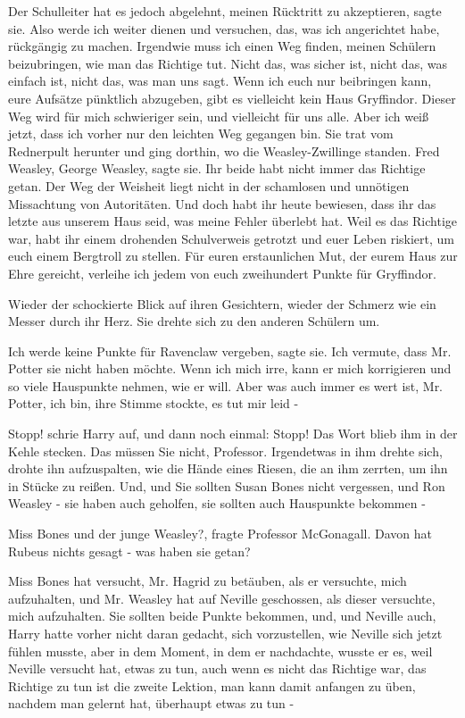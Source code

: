 \glqq{}Der Schulleiter hat es jedoch abgelehnt, meinen Rücktritt zu
akzeptieren\grqq{}, sagte sie. \glqq{}Also werde ich weiter dienen und versuchen,
das, was ich angerichtet habe, rückgängig zu machen. Irgendwie muss ich einen
Weg finden, meinen Schülern beizubringen, wie man das Richtige tut. Nicht das,
was sicher ist, nicht das, was einfach ist, nicht das, was man uns sagt. Wenn
ich euch nur beibringen kann, eure Aufsätze pünktlich abzugeben, gibt es
vielleicht kein Haus Gryffindor. Dieser Weg wird für mich schwieriger sein, und
vielleicht für uns alle. Aber ich weiß jetzt, dass ich vorher nur den leichten
Weg gegangen bin.\grqq{} Sie trat vom Rednerpult herunter und ging dorthin, wo
die Weasley-Zwillinge standen. \glqq{}Fred Weasley, George Weasley\grqq{}, sagte
sie. \glqq{}Ihr beide habt nicht immer das Richtige getan. Der Weg der Weisheit
liegt nicht in der schamlosen und unnötigen Missachtung von Autoritäten. Und
doch habt ihr heute bewiesen, dass ihr das letzte aus unserem Haus seid, was
meine Fehler überlebt hat. Weil es das Richtige war, habt ihr einem drohenden
Schulverweis getrotzt und euer Leben riskiert, um euch einem Bergtroll zu
stellen. Für euren erstaunlichen Mut, der eurem Haus zur Ehre gereicht, verleihe
ich jedem von euch zweihundert Punkte für Gryffindor.\grqq{}

Wieder der schockierte Blick auf ihren Gesichtern, wieder der Schmerz wie ein
Messer durch ihr Herz. Sie drehte sich zu den anderen Schülern um.

\glqq{}Ich werde keine Punkte für Ravenclaw vergeben\grqq{}, sagte sie. \glqq{}Ich
vermute, dass Mr. Potter sie nicht haben möchte. Wenn ich mich irre, kann er
mich korrigieren und so viele Hauspunkte nehmen, wie er will. Aber was auch
immer es wert ist, Mr. Potter, ich bin\grqq{}, ihre Stimme stockte, \glqq{}es tut
mir leid -\grqq{}

\glqq{}Stopp!\grqq{} schrie Harry auf, und dann noch einmal: \glqq{}Stopp!\grqq{}
Das Wort blieb ihm in der Kehle stecken. \glqq{}Das müssen Sie nicht,
Professor.\grqq{} Irgendetwas in ihm drehte sich, drohte ihn aufzuspalten, wie
die Hände eines Riesen, die an ihm zerrten, um ihn in Stücke zu reißen. \glqq
Und, und Sie sollten Susan Bones nicht vergessen, und Ron Weasley - sie haben
auch geholfen, sie sollten auch Hauspunkte bekommen -\grqq{}

\glqq{}Miss Bones und der junge Weasley?\grqq{}, fragte Professor McGonagall.
\glqq{}Davon hat Rubeus nichts gesagt - was haben sie getan?\grqq{}

\glqq{}Miss Bones hat versucht, Mr. Hagrid zu betäuben, als er versuchte, mich
aufzuhalten, und Mr. Weasley hat auf Neville geschossen, als dieser versuchte,
mich aufzuhalten. Sie sollten beide Punkte bekommen, und, und Neville
auch\grqq{}, Harry hatte vorher nicht daran gedacht, sich vorzustellen, wie
Neville sich jetzt fühlen musste, aber in dem Moment, in dem er nachdachte,
wusste er es, \glqq{}weil Neville versucht hat, etwas zu tun, auch wenn es nicht
das Richtige war, das Richtige zu tun ist die zweite Lektion, man kann damit
anfangen zu üben, nachdem man gelernt hat, überhaupt etwas zu tun -\grqq{}

